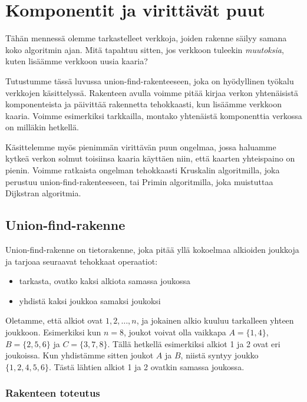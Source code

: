 \chapter{Komponentit ja virittävät puut}

Tähän mennessä olemme tarkastelleet verkkoja,
joiden rakenne säilyy samana koko algoritmin ajan.
Mitä tapahtuu sitten, jos verkkoon tuleekin \emph{muutoksia},
kuten lisäämme verkkoon uusia kaaria?

Tutustumme tässä luvussa union-find-rakenteeseen,
joka on hyödyl\-linen työkalu verkkojen käsittelyssä.
Rakenteen avulla voimme pitää kirjaa verkon yhtenäisistä
komponenteista ja päivittää rakennetta tehokkaasti,
kun lisäämme verkkoon kaaria.
Voimme esimerkiksi tarkkailla, montako yhte\-näistä
komponenttia verkossa on milläkin hetkellä.

Käsittelemme myös pienimmän virittävän puun ongelmaa,
jossa haluamme kytkeä verkon solmut toisiinsa kaaria käyttäen niin,
että kaarten yhteispaino on pienin.
Voimme ratkaista ongelman tehokkaasti Kruskalin algoritmilla,
joka perustuu union-find-rakenteeseen,
tai Primin algoritmilla, joka muistuttaa Dijkstran algoritmia.

\section{Union-find-rakenne}

Union-find-rakenne on tietorakenne, joka
pitää yllä kokoelmaa alkioiden joukkoja ja tarjoaa
seuraavat tehokkaat operaatiot:

\begin{itemize}
\item tarkasta, ovatko kaksi alkiota samassa joukossa
\item yhdistä kaksi joukkoa samaksi joukoksi
\end{itemize}

Oletamme, että alkiot ovat $1,2,\dots,n$,
ja jokainen alkio kuuluu tarkalleen yhteen joukkoon.
Esimerkiksi kun $n=8$, joukot voivat olla vaikkapa
$A=\{1,4\}$, $B=\{2,5,6\}$ ja $C=\{3,7,8\}$.
Tällä hetkellä esimerkiksi alkiot 1 ja 2 ovat eri joukoissa.
Kun yhdistämme sitten joukot $A$ ja $B$,
niistä syntyy joukko $\{1,2,4,5,6\}$.
Tästä lähtien alkiot 1 ja 2 ovatkin samassa joukossa.

\subsection{Rakenteen toteutus}

